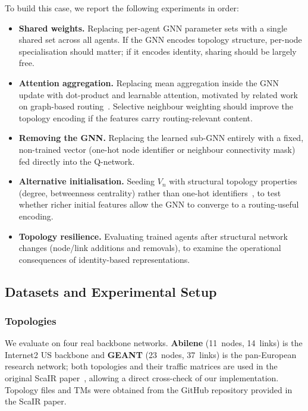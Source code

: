 \documentclass[10pt,twocolumn,letterpaper]{article}
\begin{document}
To build this case, we report the following experiments in order:
\begin{itemize}
  \item \textbf{Shared weights.} Replacing per-agent GNN parameter sets
    with a single shared set across all agents. If the GNN encodes
    topology structure, per-node specialisation should matter; if it
    encodes identity, sharing should be largely free.
  \item \textbf{Attention aggregation.} Replacing mean aggregation inside
    the GNN update with dot-product and learnable attention,
    motivated by related work on graph-based
    routing~\cite{strl,autognn}. Selective neighbour weighting should
    improve the topology encoding if the features carry routing-relevant
    content.
  \item \textbf{Removing the GNN.} Replacing the learned sub-GNN
    entirely with a fixed, non-trained vector (one-hot node identifier
    or neighbour connectivity mask) fed directly into the Q-network.
  \item \textbf{Alternative initialisation.} Seeding $V_n$ with
    structural topology properties (degree, betweenness centrality)
    rather than one-hot identifiers~\cite{init_ref1,init_ref2}, to test
    whether richer initial features allow the GNN to converge to a
    routing-useful encoding.
  \item \textbf{Topology resilience.} Evaluating trained agents after
    structural network changes (node/link additions and removals), to
    examine the operational consequences of identity-based
    representations.
\end{itemize}

\subsection{Datasets and Experimental Setup}
\label{sec:setup}

\subsubsection{Topologies}

We evaluate on four real backbone networks. \textbf{Abilene} (11~nodes,
14~links) is the Internet2 US backbone and \textbf{GEANT} (23~nodes,
37~links) is the pan-European research network; both topologies and
their traffic matrices are used in the original ScaIR
paper~\cite{scair2025}, allowing a direct cross-check of our
implementation. Topology files and TMs were obtained from the GitHub
repository provided in the ScaIR paper.
\end{document}
